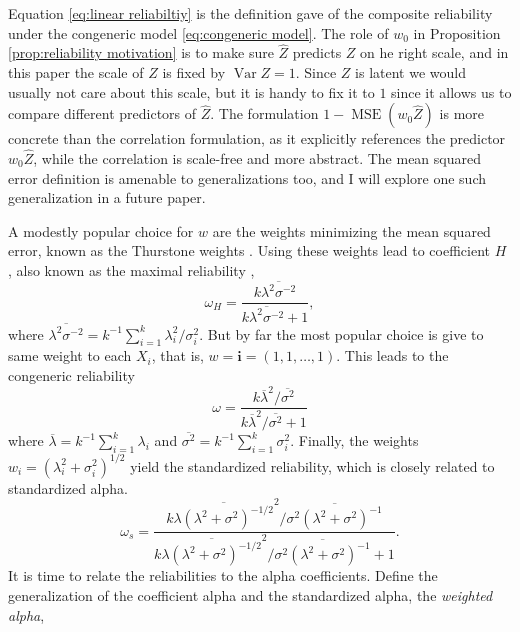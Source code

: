 \documentclass[twoside]{article}
\DeclareMathOperator{\Var}{Var}
\DeclareMathOperator{\MSE}{MSE}
\renewcommand{\sqrt}[1]{{(#1)^{1/2}}}
\begin{document}
Equation \eqref{eq:linear reliabiltiy} is the definition \citet[][p. 112]{Joreskog1971-nn} gave of the composite reliability under the congeneric model \eqref{eq:congeneric model}. The role of $w_0$ in Proposition \ref{prop:reliability motivation} is to make sure $\hat{Z}$ predicts $Z$ on he right scale, and in this paper the scale of $Z$ is fixed by $\Var Z = 1$. Since $Z$ is latent we would usually not care about this scale, but it is handy to fix it to $1$ since it allows us to compare different predictors of $\hat{Z}$. The formulation $1-\MSE (w_{0}\hat{Z})$ is more concrete than the correlation formulation, as it explicitly references the predictor $w_{0}\hat{Z}$, while the correlation is scale-free and more abstract. The mean squared error definition is amenable to generalizations too, and I will explore one such generalization in a future paper. 

A modestly popular choice for $w$ are the weights minimizing the mean squared error, known as the Thurstone weights \citep{thurshronebook}. Using these weights lead to coefficient $H$ \citep{hancock2001rethinking}, also known as the maximal reliability \citep{Li1997-yh}, 
\begin{equation}
\label{eq:coefficient_H}
\omega_{H}=\frac{k\overline{\lambda^{2}\sigma^{-2}}}{k\overline{\lambda^{2}\sigma^{-2}}+1},
\end{equation}
where $\overline{\lambda^{2}\sigma^{-2}} = k^{-1}\sum_{i=1}^{k}\lambda_{i}^2/\sigma_i^2$. But by far the most popular choice is give to same weight to each $X_i$, that is, $w = \mathbf{i}=(1,1,\ldots,1)$. This leads to the congeneric reliability
\begin{equation}
\omega =\frac{k\overline{\lambda}^{2}/\overline{\sigma^{2}}}{k\overline{\lambda}^{2}/\overline{\sigma^{2}} + 1}\label{eq:Congeneric reliability}
\end{equation}
where $\overline{\lambda}=k^{-1}\sum_{i=1}^{k}\lambda_{i}$ and
$\overline{\sigma^{2}}=k^{-1}\sum_{i=1}^{k}\sigma_{i}^{2}$. Finally, the weights $w_i = \sqrt{\lambda_i^2 + \sigma_i^2}$ yield the standardized reliability, which is closely related to standardized alpha.
\begin{equation}
\omega_s=\frac{k\overline{\lambda(\lambda^{2}+\sigma^{2})^{-1/2}}^{2}/\overline{\sigma^{2}(\lambda^{2}+\sigma^{2})^{-1}}}{k\overline{\lambda(\lambda^{2}+\sigma^{2})^{-1/2}}^{2}/\overline{\sigma^{2}(\lambda^{2}+\sigma^{2})^{-1}}+1}.\label{eq:Standardized reliability}
\end{equation}
It is time to relate the reliabilities to the alpha coefficients.
Define the generalization of the coefficient alpha and the standardized
alpha, the \emph{weighted alpha},
\end{document}
